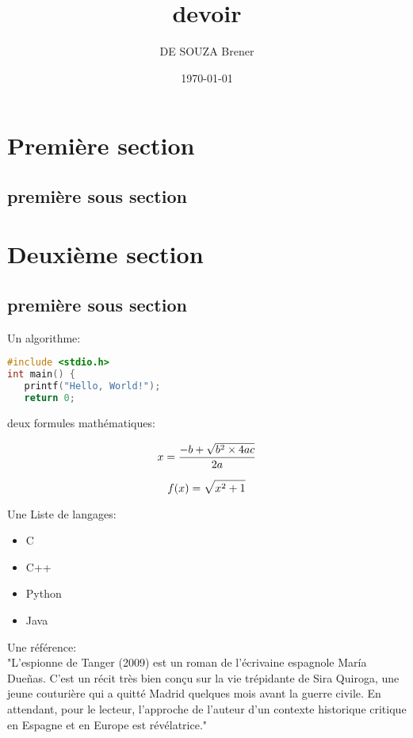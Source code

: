 \documentclass{article}
\title{devoir}
\author{DE SOUZA Brener}
\date{\today}
\begin{document}
\maketitle
\pagebreak

\tableofcontents
\listoffigures
\listoftables


\section{Première section}
\subsection{première sous section}

\section{Deuxième section}
\subsection{première sous section}

Un algorithme: \\

\begin{lstlisting}[language=c]
#include <stdio.h>
int main() {
   printf("Hello, World!");
   return 0;
\end{lstlisting}

deux formules mathématiques: 

\begin{equation} \\
    x=\frac{-b+\sqrt{b^{2}\times4ac}}{2a}
\end{equation}

\begin{equation} \\
    f(x) = \sqrt{x^{2}+1}
\end{equation}

Une Liste de langages:
\begin{itemize}
    \item C
    \item C++
    \item Python
    \item Java
\end{itemize}

Une référence: \\

"L'espionne de Tanger (2009) \cite{maria} est un roman de l'écrivaine espagnole María Dueñas. C'est un récit très bien conçu sur la vie trépidante de Sira Quiroga, une jeune couturière qui a quitté Madrid quelques mois avant la guerre civile. En attendant, pour le lecteur, l'approche de l'auteur d'un contexte historique critique en Espagne et en Europe est révélatrice."
\end{document}
